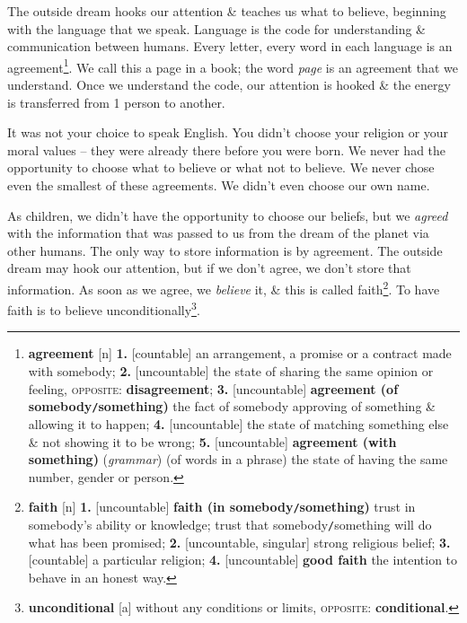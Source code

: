 \documentclass[oneside]{book}
\numberwithin{equation}{section}
\begin{document}
The outside dream hooks our attention \& teaches us what to believe, beginning with the language that we speak. Language is the code for understanding \& communication between humans. Every letter, every word in each language is an agreement\footnote{\textbf{agreement} [n] \textbf{1.} [countable] an arrangement, a promise or a contract made with somebody; \textbf{2.} [uncountable] the state of sharing the same opinion or feeling, \textsc{opposite}: \textbf{disagreement}; \textbf{3.} [uncountable] \textbf{agreement (of somebody\texttt{/}something)} the fact of somebody approving of something \& allowing it to happen; \textbf{4.} [uncountable] the state of matching something else \& not showing it to be wrong; \textbf{5.} [uncountable] \textbf{agreement (with something)} (\textit{grammar}) (of words in a phrase) the state of having the same number, gender or person.}. We call this a page in a book; the word \textit{page} is an agreement that we understand. Once we understand the code, our attention is hooked \& the energy is transferred from 1 person to another.

It was not your choice to speak English. You didn't choose your religion or your moral values -- they were already there before you were born. We never had the opportunity to choose what to believe or what not to believe. We never chose even the smallest of these agreements. We didn't even choose our own name.

As children, we didn't have the opportunity to choose our beliefs, but we \textit{agreed} with the information that was passed to us from the dream of the planet via other humans. The only way to store information is by agreement. The outside dream may hook our attention, but if we don't agree, we don't store that information. As soon as we agree, we \textit{believe} it, \& this is called faith\footnote{\textbf{faith} [n] \textbf{1.} [uncountable] \textbf{faith (in somebody\texttt{/}something)} trust in somebody's ability or knowledge; trust that somebody\texttt{/}something will do what has been promised; \textbf{2.} [uncountable, singular] strong religious belief; \textbf{3.} [countable] a particular religion; \textbf{4.} [uncountable] \textbf{good faith} the intention to behave in an honest way.}. To have faith is to believe unconditionally\footnote{\textbf{unconditional} [a] without any conditions or limits, \textsc{opposite}: \textbf{conditional}.}.
\end{document}
